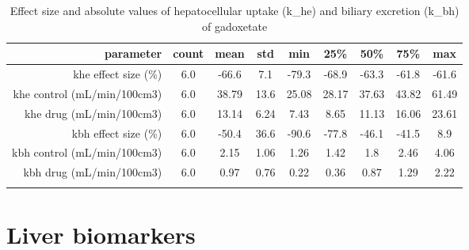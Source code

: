 \documentclass{epflreport}%
\begin{document}
%
\begin{longtable}{rcccccccc}%
\hline%
parameter&count&mean&std&min&25\%&50\%&75\%&max\\%
\hline%
khe effect size (\%)&6.0&{-}66.6&7.1&{-}79.3&{-}68.9&{-}63.3&{-}61.8&{-}61.6\\%
khe control (mL/min/100cm3)&6.0&38.79&13.6&25.08&28.17&37.63&43.82&61.49\\%
khe drug (mL/min/100cm3)&6.0&13.14&6.24&7.43&8.65&11.13&16.06&23.61\\%
kbh effect size (\%)&6.0&{-}50.4&36.6&{-}90.6&{-}77.8&{-}46.1&{-}41.5&8.9\\%
kbh control (mL/min/100cm3)&6.0&2.15&1.06&1.26&1.42&1.8&2.46&4.06\\%
kbh drug (mL/min/100cm3)&6.0&0.97&0.76&0.22&0.36&0.87&1.29&2.22\\%
\hline%
\caption{Effect size and absolute values of hepatocellular uptake (k\_he) and biliary excretion (k\_bh) of gadoxetate} \\%
\end{longtable}%
\clearpage%
\section{Liver biomarkers}%
\label{sec:Liverbiomarkers}%
\end{document}
